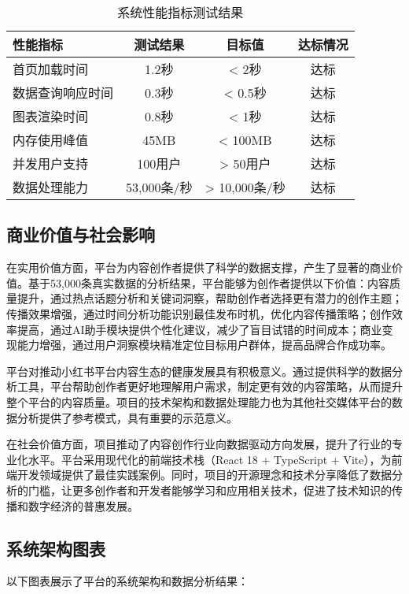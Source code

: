 \documentclass[12pt,a4paper]{article}
\begin{document}
\begin{table}[H]
\centering
\caption{系统性能指标测试结果}
\begin{tabular}{|l|c|c|c|}
\hline
\textbf{性能指标} & \textbf{测试结果} & \textbf{目标值} & \textbf{达标情况} \\
\hline
首页加载时间 & 1.2秒 & < 2秒 & 达标 \\
\hline
数据查询响应时间 & 0.3秒 & < 0.5秒 & 达标 \\
\hline
图表渲染时间 & 0.8秒 & < 1秒 & 达标 \\
\hline
内存使用峰值 & 45MB & < 100MB & 达标 \\
\hline
并发用户支持 & 100用户 & > 50用户 & 达标 \\
\hline
数据处理能力 & 53,000条/秒 & > 10,000条/秒 & 达标 \\
\hline
\end{tabular}
\end{table}

\subsection{商业价值与社会影响}

在实用价值方面，平台为内容创作者提供了科学的数据支撑，产生了显著的商业价值。基于53,000条真实数据的分析结果，平台能够为创作者提供以下价值：内容质量提升，通过热点话题分析和关键词洞察，帮助创作者选择更有潜力的创作主题；传播效果增强，通过时间分析功能识别最佳发布时机，优化内容传播策略；创作效率提高，通过AI助手模块提供个性化建议，减少了盲目试错的时间成本；商业变现能力增强，通过用户洞察模块精准定位目标用户群体，提高品牌合作成功率。

平台对推动小红书平台内容生态的健康发展具有积极意义。通过提供科学的数据分析工具，平台帮助创作者更好地理解用户需求，制定更有效的内容策略，从而提升整个平台的内容质量。项目的技术架构和数据处理能力也为其他社交媒体平台的数据分析提供了参考模式，具有重要的示范意义。

在社会价值方面，项目推动了内容创作行业向数据驱动方向发展，提升了行业的专业化水平。平台采用现代化的前端技术栈（React 18 + TypeScript + Vite），为前端开发领域提供了最佳实践案例。同时，项目的开源理念和技术分享降低了数据分析的门槛，让更多创作者和开发者能够学习和应用相关技术，促进了技术知识的传播和数字经济的普惠发展。

\subsection{系统架构图表}

以下图表展示了平台的系统架构和数据分析结果：
\end{document}
